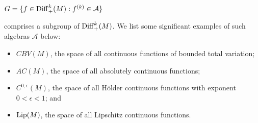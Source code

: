 \documentclass[12pt]{amsart}
\theoremstyle{definition}
\theoremstyle{remark}
\newcommand{\Diff}{\mathop{\rm Diff}}
\begin{document}
\begin{center} $G=\{f\in\Diff_+^k(M):f^{(k)}\in\mathcal{A}\}$
\end{center}
\vspace{.3cm}

\noindent comprises a subgroup of $\Diff_+^k(M)$.  We list some significant examples of such algebras $\mathcal{A}$ below:\\

\begin{itemize}
		\item $CBV(M)$, the space of all continuous functions of bounded total variation;
		\item $AC(M)$, the space of all absolutely continuous functions;
		\item $C^{0,\epsilon}(M)$, the space of all H\"older continuous functions with exponent $0<\epsilon<1$; and
		\item $\mbox{\rm Lip}(M)$, the space of all Lipschitz continuous functions.
\end{itemize}
\vspace{.3cm}
\end{document}
